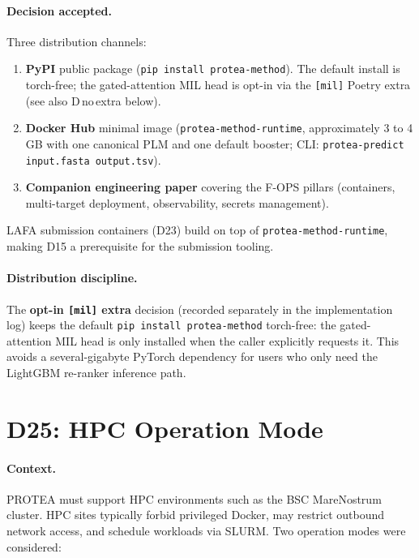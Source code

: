 \paragraph{Decision accepted.}
Three distribution channels:

\begin{enumerate}
  \item \textbf{PyPI} public package (\texttt{pip install protea-method}).
    The default install is torch-free; the gated-attention MIL head is
    opt-in via the \texttt{[mil]} Poetry extra (see also D\,no\,extra below).
  \item \textbf{Docker Hub} minimal image (\texttt{protea-method-runtime},
    approximately 3 to 4\,GB with one canonical PLM and one default booster;
    CLI: \texttt{protea-predict input.fasta output.tsv}).
  \item \textbf{Companion engineering paper} covering the F-OPS pillars
    (containers, multi-target deployment, observability, secrets management).
\end{enumerate}

LAFA submission containers (D23) build on top of
\texttt{protea-method-runtime}, making D15 a prerequisite for the submission
tooling.

\paragraph{Distribution discipline.}
The \textbf{opt-in \texttt{[mil]} extra} decision (recorded separately in the
implementation log) keeps the default \texttt{pip install protea-method}
torch-free: the gated-attention MIL head is only installed when the caller
explicitly requests it. This avoids a several-gigabyte PyTorch dependency for
users who only need the LightGBM re-ranker inference path.

\section{D25: HPC Operation Mode}
\label{app:adr-d25}

\paragraph{Context.}
PROTEA must support HPC environments such as the BSC MareNostrum cluster.
HPC sites typically forbid privileged Docker, may restrict outbound network
access, and schedule workloads via SLURM. Two operation modes were
considered:

